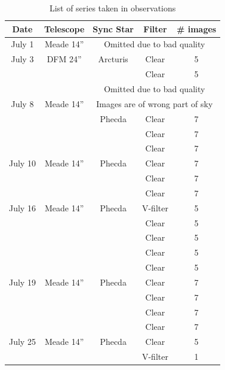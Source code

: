 \documentclass[12pt,journal,compsoc]{IEEEtran}
\begin{document}
\begin{table}[!t]
\centering
\begin{tabular}{|c|c|c|c|c|}
\hline
Date & Telescope & Sync Star & Filter & \# images \\ \hline \hline
July 1 &Meade 14''& \multicolumn{3}{c|}{Omitted due to bad quality}\\ \hline \hline
July 3 & DFM 24''& Arcturis & Clear & 5 \\ \cline{4-5}
 & & & Clear & 5\\ \cline{3-5}
 & & \multicolumn{3}{c|}{Omitted due to bad quality} \\ \hline \hline
July 8 & Meade 14'' &\multicolumn{3}{c|}{Images are of wrong part of sky} \\ \cline{3-5}
 & & Phecda & Clear & 7 \\ \cline{4-5}
 & & & Clear & 7\\ \cline{4-5}
 & & & Clear & 7\\ \hline \hline
July 10 & Meade 14''& Phecda & Clear &7 \\ \cline{4-5}
 & & & Clear & 7\\ \cline{4-5}
 & & & Clear & 7\\ \hline \hline
July 16 & Meade 14''& Phecda & V-filter &5 \\ \cline{4-5}
 & & & Clear & 5\\ \cline{4-5}
 & & & Clear & 5\\ \cline{4-5}
 & & & Clear & 5\\ \cline{4-5}
 & & & Clear & 5\\ \hline \hline
July 19 & Meade 14''& Phecda & Clear &7 \\ \cline{4-5}
 & & & Clear & 7\\ \cline{4-5}
 & & & Clear & 7\\ \cline{4-5}
 & & & Clear & 7\\ \hline \hline
July 25 & Meade 14'' & Phecda & Clear &5 \\ \cline{4-5}
 & & & V-filter & 1\\ \hline
\end{tabular}
\caption{List of series taken in observations \label{tab:serieslist}}
\end{table}
\end{document}
